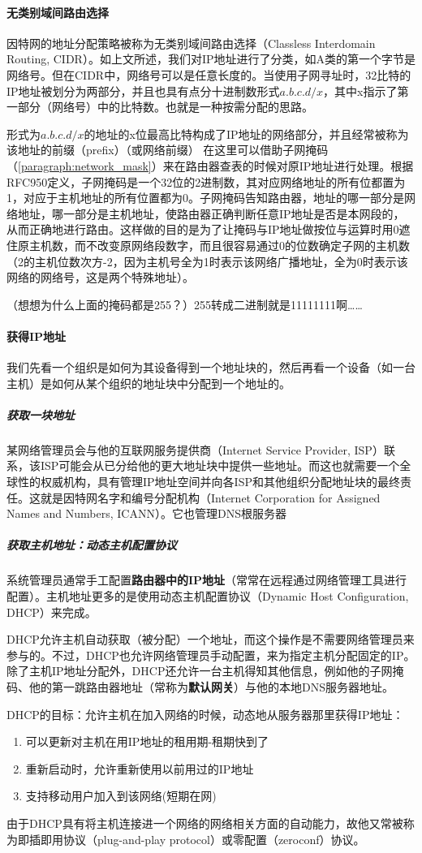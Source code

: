 \documentclass[]{report}
\begin{document}
			\paragraph{无类别域间路由选择}
			因特网的地址分配策略被称为无类别域间路由选择（Classless Interdomain Routing, CIDR）。如上文所述，我们对IP地址进行了分类，如A类的第一个字节是网络号。但在CIDR中，网络号可以是任意长度的。当使用子网寻址时，32比特的IP地址被划分为两部分，并且也具有点分十进制数形式$a.b.c.d/x$，其中x指示了第一部分（网络号）中的比特数。也就是一种按需分配的思路。\par
			形式为$a.b.c.d/x$的地址的x位最高比特构成了IP地址的网络部分，并且经常被称为该地址的前缀（prefix）（或网络前缀）
			在这里可以借助子网掩码（\ref{paragraph:network_mask}）来在路由器查表的时候对原IP地址进行处理。根据RFC950定义，子网掩码是一个32位的2进制数，其对应网络地址的所有位都置为1，对应于主机地址的所有位置都为0。子网掩码告知路由器，地址的哪一部分是网络地址，哪一部分是主机地址，使路由器正确判断任意IP地址是否是本网段的，从而正确地进行路由。这样做的目的是为了让掩码与IP地址做按位与运算时用0遮住原主机数，而不改变原网络段数字，而且很容易通过0的位数确定子网的主机数（2的主机位数次方-2，因为主机号全为1时表示该网络广播地址，全为0时表示该网络的网络号，这是两个特殊地址）。\par
			（想想为什么上面的掩码都是255？）255转成二进制就是11111111啊……
			\paragraph{获得IP地址}
			我们先看一个组织是如何为其设备得到一个地址块的，然后再看一个设备（如一台主机）是如何从某个组织的地址块中分配到一个地址的。
				\subparagraph{获取一块地址}
				某网络管理员会与他的互联网服务提供商（Internet Service Provider, ISP）联系，该ISP可能会从已分给他的更大地址块中提供一些地址。而这也就需要一个全球性的权威机构，具有管理IP地址空间并向各ISP和其他组织分配地址块的最终责任。这就是因特网名字和编号分配机构（Internet Corporation for Assigned Names and Numbers, ICANN）。它也管理DNS根服务器
				\subparagraph{获取主机地址：动态主机配置协议}
				系统管理员通常手工配置\textbf{路由器中的IP地址}（常常在远程通过网络管理工具进行配置）。主机地址更多的是使用动态主机配置协议（Dynamic Host Configuration, DHCP）来完成。\par
				DHCP允许主机自动获取（被分配）一个地址，而这个操作是不需要网络管理员来参与的。不过，DHCP也允许网络管理员手动配置，来为指定主机分配固定的IP。除了主机IP地址分配外，DHCP还允许一台主机得知其他信息，例如他的子网掩码、他的第一跳路由器地址（常称为\textbf{默认网关}）与他的本地DNS服务器地址。\par
				DHCP的目标：允许主机在加入网络的时候，动态地从服务器那里获得IP地址：
				\begin{enumerate}
					\item 可以更新对主机在用IP地址的租用期-租期快到了
					\item 重新启动时，允许重新使用以前用过的IP地址
					\item 支持移动用户加入到该网络(短期在网)
				\end{enumerate}\par
				由于DHCP具有将主机连接进一个网络的网络相关方面的自动能力，故他又常被称为即插即用协议（plug-and-play protocol）或零配置（zeroconf）协议。\par
\end{document}
